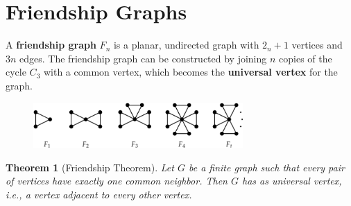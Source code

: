 \documentclass{article}
\newtheorem{theorem}{Theorem}[section]
\begin{document}
\section{Friendship Graphs}
A \textbf{friendship graph} $F_n$ is a planar, undirected graph with $2_n + 1$ vertices and $3n$ edges. The friendship graph can be constructed by joining $n$ copies of the cycle $C_3$ with a common vertex, which becomes the \textbf{universal vertex} for the graph.  

\begin{figure}[htp]
    \centering
    \includegraphics[width=8cm]{friendship_graphs.png}
    \label{fig:friendship_graphs}
\end{figure}

\begin{theorem}[Friendship Theorem]
\label{theorem:friendship}
Let $G$ be a finite graph such that every pair of vertices have exactly one common neighbor. Then $G$ has as universal vertex, i.e., a vertex adjacent to every other vertex.
\end{theorem}
\end{document}
